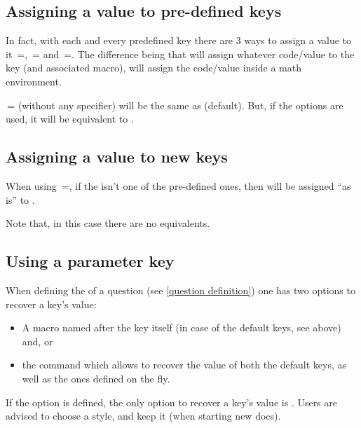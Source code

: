 \documentclass[10pt]{article}
\begin{document}
\subsection{Assigning a value to pre-defined keys}
In fact, with each and every predefined key there are 3 ways to assign a value to it \,=, \,= and \,=. The difference being that  will assign whatever code/value to the key (and associated macro),  will assign the code/value inside a math environment. 
\begin{tsremark}
\,= (without any specifier) will be the same as  (default). But, if the options  are used, it will be equivalent to .
\end{tsremark}

\subsection{Assigning a value to new keys}
When using  \,=, if the  isn't one of the pre-defined ones, then  will be assigned ``as is'' to .
\begin{tsremark}
Note that, in this case there are no  equivalents. 
\end{tsremark}

\subsection{Using a parameter key}
When defining the  of a question (see \ref{question definition}) one has two options to recover a key's value:
\begin{itemize}
  \item A macro named after the key itself (in case of the default keys, see above) and, or
  \item the \tsobj{\QuestVal} command which allows to recover the value of both the default keys, as well as the ones defined on the fly.
\end{itemize}
\begin{tsremark}
If the option  is defined, the only option to recover a key's value is \tsobj{\QuestVal}. Users are advised to choose a style, and keep it (when starting new docs).
\end{tsremark}
\end{document}
